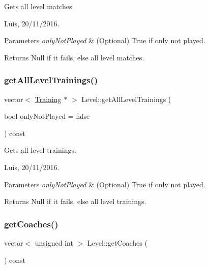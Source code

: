 Gets all level matches. 

Luís, 20/11/2016. 


\begin{DoxyParams}{Parameters}
{\em only\+Not\+Played} & (Optional) True if only not played. \\
\hline
\end{DoxyParams}


\begin{DoxyReturn}{Returns}
Null if it fails, else all level matches. 
\end{DoxyReturn}
\hypertarget{class_level_aaf1c5f18fbbc46890d5849ab5bf4eb91}{}\label{class_level_aaf1c5f18fbbc46890d5849ab5bf4eb91} 
\subsubsection{\texorpdfstring{get\+All\+Level\+Trainings()}{getAllLevelTrainings()}}
{\footnotesize\ttfamily vector$<$ \hyperlink{class_training}{Training} $\ast$ $>$ Level\+::get\+All\+Level\+Trainings (\begin{DoxyParamCaption}\item[{bool}]{only\+Not\+Played = {\ttfamily false} }\end{DoxyParamCaption}) const}



Gets all level trainings. 

Luís, 20/11/2016. 


\begin{DoxyParams}{Parameters}
{\em only\+Not\+Played} & (Optional) True if only not played. \\
\hline
\end{DoxyParams}


\begin{DoxyReturn}{Returns}
Null if it fails, else all level trainings. 
\end{DoxyReturn}
\hypertarget{class_level_a2130d8ee6b56f18821e5606c757661d3}{}\label{class_level_a2130d8ee6b56f18821e5606c757661d3} 
\subsubsection{\texorpdfstring{get\+Coaches()}{getCoaches()}}
{\footnotesize\ttfamily vector$<$ unsigned int $>$ Level\+::get\+Coaches (\begin{DoxyParamCaption}{ }\end{DoxyParamCaption}) const}



